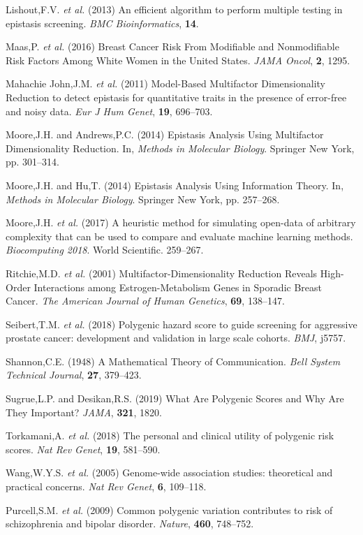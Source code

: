 \documentclass[a4paper,twoside, 9pt]{article}
\begin{document}
\leavevmode\hypertarget{ref-S6nj6BFK}{}%
Lishout,F.V. \emph{et al.} (2013) An efficient algorithm to perform
multiple testing in epistasis screening. \emph{BMC Bioinformatics},
\textbf{14}.

\leavevmode\hypertarget{ref-Z12fynub}{}%
Maas,P. \emph{et al.} (2016) Breast Cancer Risk From Modifiable and
Nonmodifiable Risk Factors Among White Women in the United States.
\emph{JAMA Oncol}, \textbf{2}, 1295.

\leavevmode\hypertarget{ref-kN4MaLuT}{}%
Mahachie John,J.M. \emph{et al.} (2011) Model-Based Multifactor
Dimensionality Reduction to detect epistasis for quantitative traits in
the presence of error-free and noisy data. \emph{Eur J Hum Genet},
\textbf{19}, 696--703.

\leavevmode\hypertarget{ref-1BqLrlGsj}{}%
Moore,J.H. and Andrews,P.C. (2014) Epistasis Analysis Using Multifactor
Dimensionality Reduction. In, \emph{Methods in Molecular Biology}.
Springer New York, pp. 301--314.

\leavevmode\hypertarget{ref-1FFMLUZxb}{}%
Moore,J.H. and Hu,T. (2014) Epistasis Analysis Using Information Theory.
In, \emph{Methods in Molecular Biology}. Springer New York, pp.
257--268.

\leavevmode\hypertarget{ref-pDXdtMFa}{}%
Moore,J.H. \emph{et al.} (2017) A heuristic method for simulating
open-data of arbitrary complexity that can be used to compare and
evaluate machine learning methods. \emph{Biocomputing 2018}. World Scientific. 259--267.

\leavevmode\hypertarget{ref-E26QhGxD}{}%
Ritchie,M.D. \emph{et al.} (2001) Multifactor-Dimensionality Reduction
Reveals High-Order Interactions among Estrogen-Metabolism Genes in
Sporadic Breast Cancer. \emph{The American Journal of Human Genetics},
\textbf{69}, 138--147.

\leavevmode\hypertarget{ref-gkABDVTx}{}%
Seibert,T.M. \emph{et al.} (2018) Polygenic hazard score to guide
screening for aggressive prostate cancer: development and validation in
large scale cohorts. \emph{BMJ}, j5757.

\leavevmode\hypertarget{ref-yzGboP1g}{}%
Shannon,C.E. (1948) A Mathematical Theory of Communication. \emph{Bell
System Technical Journal}, \textbf{27}, 379--423.

\leavevmode\hypertarget{ref-1Dlv3tAGh}{}%
Sugrue,L.P. and Desikan,R.S. (2019) What Are Polygenic Scores and Why
Are They Important? \emph{JAMA}, \textbf{321}, 1820.

\leavevmode\hypertarget{ref-1GK3F1BxE}{}%
Torkamani,A. \emph{et al.} (2018) The personal and clinical utility of
polygenic risk scores. \emph{Nat Rev Genet}, \textbf{19}, 581--590.

\leavevmode\hypertarget{ref-12kQ0EOWQ}{}%
Wang,W.Y.S. \emph{et al.} (2005) Genome-wide association studies:
theoretical and practical concerns. \emph{Nat Rev Genet}, \textbf{6},
109--118.

\leavevmode\hypertarget{ref-mwTa2RUK}{}%
Purcell,S.M. \emph{et al.} (2009) Common polygenic variation contributes to risk of schizophrenia
and bipolar disorder. \emph{Nature}, \textbf{460}, 748--752.
\end{document}
